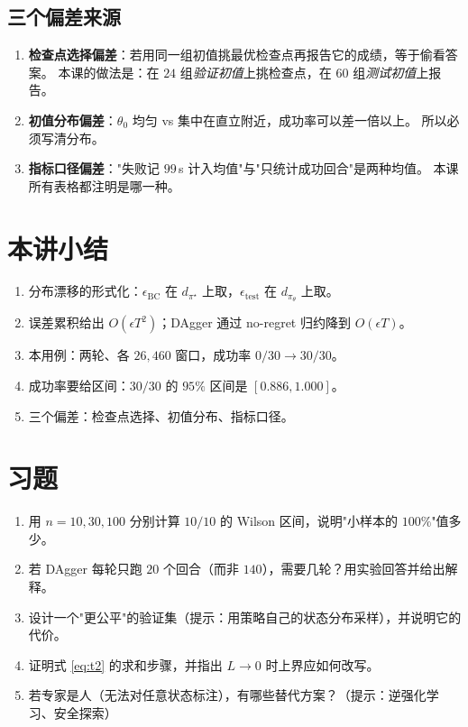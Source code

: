 \subsection{三个偏差来源}

\begin{enumerate}[leftmargin=2em,itemsep=3pt]
  \item \textbf{检查点选择偏差}：若用同一组初值挑最优检查点再报告它的成绩，等于偷看答案。
        本课的做法是：在 $24$ 组\emph{验证初值}上挑检查点，在 $60$ 组\emph{测试初值}上报告。
  \item \textbf{初值分布偏差}：$\theta_0$ 均匀 vs 集中在直立附近，成功率可以差一倍以上。
        所以必须写清分布。
  \item \textbf{指标口径偏差}："失败记 $99$\,s 计入均值"与"只统计成功回合"是两种均值。
        本课所有表格都注明是哪一种。
\end{enumerate}

\section{本讲小结}
\begin{enumerate}[leftmargin=2em,itemsep=2pt]
  \item 分布漂移的形式化：$\epsilon_{\text{BC}}$ 在 $d_{\pi^\star}$ 上取，$\epsilon_{\text{test}}$ 在 $d_{\pi_\theta}$ 上取。
  \item 误差累积给出 $O(\epsilon T^2)$；DAgger 通过 no-regret 归约降到 $O(\epsilon T)$。
  \item 本用例：两轮、各 $26{,}460$ 窗口，成功率 $0/30\to30/30$。
  \item 成功率要给区间：$30/30$ 的 $95\%$ 区间是 $[0.886,1.000]$。
  \item 三个偏差：检查点选择、初值分布、指标口径。
\end{enumerate}

\section*{习题}
\begin{enumerate}[leftmargin=2em,itemsep=6pt]
  \item 用 $n=10,30,100$ 分别计算 $10/10$ 的 Wilson 区间，说明"小样本的 $100\%$"值多少。
  \item 若 DAgger 每轮只跑 $20$ 个回合（而非 $140$），需要几轮？用实验回答并给出解释。
  \item 设计一个"更公平"的验证集（提示：用策略自己的状态分布采样），并说明它的代价。
  \item 证明式 \eqref{eq:t2} 的求和步骤，并指出 $L\to0$ 时上界应如何改写。
  \item 若专家是人（无法对任意状态标注），有哪些替代方案？（提示：逆强化学习、安全探索）
\end{enumerate}

